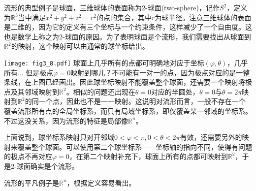流形的典型例子是球面，三维球体的表面称为2-球面(two-sphere)，记作$S^2$，定义为$\mathbb{R}^3$当中满足$x^2 + y^2 + z^2 = r^2$的点的集合，其中$r$为球半径。注意三维球体的表面是二维的，因为它的定义有三个坐标与一个约束条件，这样减少了一个自由度。这也是数学上称之为2-球面的原因。为了表明球面是个流形，我们需要找出从球面到$\mathbb{R}^2$的映射，这个映射可以由通常的球坐标给出。

{
\centering
	\captionsetup{type=figure}
    \texttt{[image: fig3\_8.pdf]}
}
球面上几乎所有的点都可明确地对应于坐标$(\varphi, \theta)$，几乎所有... 但是极点$\varphi = 0$映射到哪儿？不可能有一对一的点，因为极点对应的是一整条线，在上图已经画出。因此球坐标映射不能覆盖整个球面，还需要一个映射将极点及其邻域映射到$\mathbb{R}^2$。相似的问题还出现在$\theta = 0$对应的半圆处，$\theta = 0$与$\theta = 2\pi$映射到$\mathbb{R}^2$的同一个点，因此也不是一一映射。这说明对流形而言，一般不存在一个覆盖流形所有点的全局坐标系，而只有局域坐标系，即仅覆盖某一邻域的坐标系。不过这没关系，因为流形的特征是局部像$\mathbb{R}^n$。

上面说到，球坐标系映射只对开邻域$0 < \varphi < \pi, 0 < \theta < 2\pi$有效，还需要另外的映射来覆盖整个球面。可以使用第二个球坐标系——坐标轴的指向不同，使得有问题的极点不再对应$\varphi = 0$，在第二个映射补充下，球面上所有的点都可映射到$\mathbb{R}^2$，于是2-球面确实是个流形。

流形的平凡例子是$\mathbb{R}^n$，根据定义容易看出。
